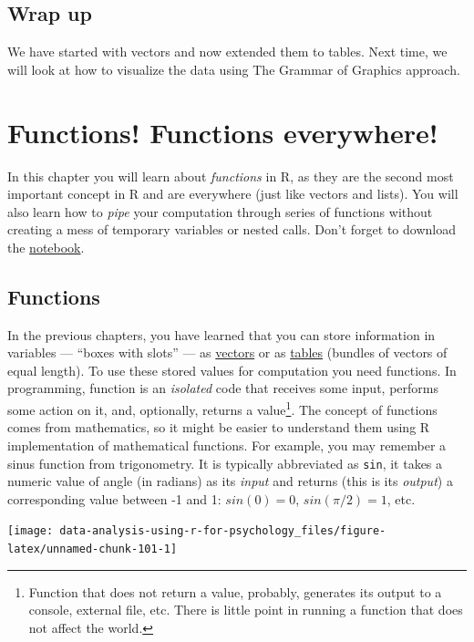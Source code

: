 \documentclass[
]{book}
\begin{document}
\hypertarget{wrap-up-1}{%
\section{Wrap up}\label{wrap-up-1}}

We have started with vectors and now extended them to tables. Next time, we will look at how to visualize the data using The Grammar of Graphics approach.

\hypertarget{functions}{%
\chapter{Functions! Functions everywhere!}\label{functions}}

In this chapter you will learn about \emph{functions} in R, as they are the second most important concept in R and are everywhere (just like vectors and lists). You will also learn how to \emph{pipe} your computation through series of functions without creating a mess of temporary variables or nested calls. Don't forget to download the \href{notebooks/Seminar\%2004\%20-\%20functions.Rmd}{notebook}.

\hypertarget{functions-1}{%
\section{Functions}\label{functions-1}}

In the previous chapters, you have learned that you can store information in variables --- ``boxes with slots'' --- as \protect\hyperlink{vectors}{vectors} or as \protect\hyperlink{tables}{tables} (bundles of vectors of equal length). To use these stored values for computation you need functions. In programming, function is an \emph{isolated} code that receives some input, performs some action on it, and, optionally, returns a value\footnote{Function that does not return a value, probably, generates its output to a console, external file, etc. There is little point in running a function that does not affect the world.}. The concept of functions comes from mathematics, so it might be easier to understand them using R implementation of mathematical functions. For example, you may remember a sinus function from trigonometry. It is typically abbreviated as \texttt{sin}, it takes a numeric value of angle (in radians) as its \emph{input} and returns (this is its \emph{output}) a corresponding value between -1 and 1: \(sin(0) = 0\), \(sin(\pi/2) = 1\), etc.

\begin{center}\texttt{[image: data-analysis-using-r-for-psychology\_files/figure-latex/unnamed-chunk-101-1]} \end{center}
\end{document}
